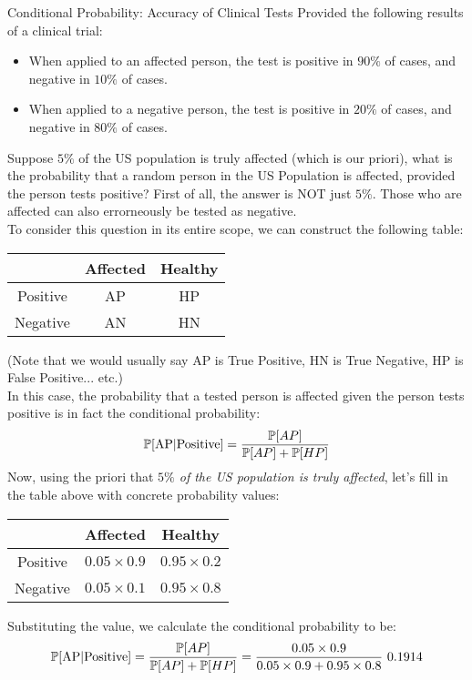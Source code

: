 \begin{ln-quest}{Conditional Probability: Accuracy of Clinical Tests}{}
    Provided the following results of a clinical trial:
    \begin{itemize}
        \item When applied to an affected person, the test is positive in $90\%$ of cases, and negative in $10\%$ of cases.
        \item When applied to a negative person, the test is positive in $20\%$ of cases, and negative in $80\%$ of cases.
    \end{itemize}
    Suppose $5\%$ of the US population is truly affected (which is our priori), what is the probability that a random person in the US Population is affected, provided the person tests positive?
    \tcblower
    First of all, the answer is NOT just $5\%$. Those who are affected can also errorneously be tested as negative. \\
    To consider this question in its entire scope, we can construct the following table:
    \begin{center}
        \begin{tabular}{c||c|c}
            & Affected & Healthy \\
            \hline
            \hline
            Positive & AP & HP \\
            \hline
            Negative & AN & HN
        \end{tabular}
    \end{center}
    (Note that we would usually say AP is True Positive, HN is True Negative, HP is False Positive... etc.) \\
    In this case, the probability that a tested person is affected given the person tests positive is in fact the conditional probability:
    \[\P[\text{AP}|\text{Positive}] = \frac{\P[AP]}{\P[AP] + \P[HP]}\]
    Now, using the priori that \textit{$5\%$ of the US population is truly affected}, let's fill in the table above with concrete probability values:
    \begin{center}
        \begin{tabular}{c||c|c}
            & Affected & Healthy \\
            \hline
            \hline
            Positive & $0.05 \times 0.9$ & $0.95 \times 0.2$ \\
            \hline
            Negative & $0.05 \times 0.1$ & $0.95 \times 0.8$
        \end{tabular}
    \end{center}
    Substituting the value, we calculate the conditional probability to be:
    \[\P[\text{AP}|\text{Positive}] = \frac{\P[AP]}{\P[AP] + \P[HP]} = \frac{0.05 \times 0.9}{0.05 \times 0.9 + 0.95 \times 0.8} ~ 0.1914\]
\end{ln-quest}
